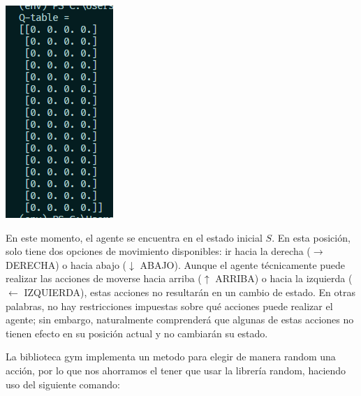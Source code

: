 \documentclass{article}
\begin{document}
\vspace{0.5cm}

\begin{center}
    \includegraphics[width=0.5\linewidth]{QTable_ceros.png}
\end{center}

\vspace{0.5cm}

En este momento, el agente se encuentra en el estado inicial $S$. En esta posición, solo tiene dos opciones de movimiento disponibles: ir hacia la derecha ($\rightarrow$ DERECHA) o hacia abajo ($\downarrow$ ABAJO). Aunque el agente técnicamente puede realizar las acciones de moverse hacia arriba ($\uparrow$ ARRIBA) o hacia la izquierda ($\leftarrow$ IZQUIERDA), estas acciones no resultarán en un cambio de estado. En otras palabras, no hay restricciones impuestas sobre qué acciones puede realizar el agente; sin embargo, naturalmente comprenderá que algunas de estas acciones no tienen efecto en su posición actual y no cambiarán su estado.

\vspace{0.5cm}

La biblioteca gym implementa un metodo para elegir de manera random una acción, por lo que nos ahorramos el tener que usar la librería random, haciendo uso del siguiente comando:
\end{document}
